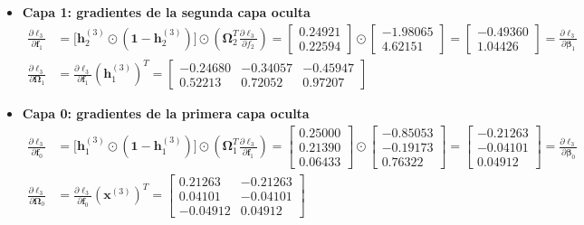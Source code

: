 \documentclass[10pt,a4paper]{article}
\begin{document}
{\begin{itemize}
    \item \textbf{Capa 1: gradientes de la segunda capa oculta}
    \begin{align*}
    \frac{\partial \ell_3}{\partial \mathbf{f}_1} &= \big[\mathbf{h}_2^{(3)} \odot (\mathbf{1} - \mathbf{h}_2^{(3)})\big] \odot \left(\boldsymbol{\Omega}_2^T \frac{\partial \ell_3}{\partial f_2}\right) = \begin{bmatrix} 0.24921 \\ 0.22594 \end{bmatrix} \odot \begin{bmatrix} -1.98065 \\ 4.62151 \end{bmatrix} = \mathbf{\begin{bmatrix} -0.49360 \\ 1.04426 \end{bmatrix}} = \frac{\partial \ell_3}{\partial \boldsymbol{\beta}_1} \\[0.1cm]
    \frac{\partial \ell_3}{\partial \boldsymbol{\Omega}_1} &= \frac{\partial \ell_3}{\partial \mathbf{f}_1} (\mathbf{h}_1^{(3)})^T = \mathbf{\begin{bmatrix} -0.24680 & -0.34057 & -0.45947 \\ 0.52213 & 0.72052 & 0.97207 \end{bmatrix}}
    \end{align*}

    \item \textbf{Capa 0: gradientes de la primera capa oculta}
    \begin{align*}
    \frac{\partial \ell_3}{\partial \mathbf{f}_0} &= \big[\mathbf{h}_1^{(3)} \odot (\mathbf{1} - \mathbf{h}_1^{(3)})\big] \odot \left(\boldsymbol{\Omega}_1^T \frac{\partial \ell_3}{\partial \mathbf{f}_1}\right) = \begin{bmatrix} 0.25000 \\ 0.21390 \\ 0.06433 \end{bmatrix} \odot \begin{bmatrix} -0.85053 \\ -0.19173 \\ 0.76322 \end{bmatrix} = \mathbf{\begin{bmatrix} -0.21263 \\ -0.04101 \\ 0.04912 \end{bmatrix}} = \frac{\partial \ell_3}{\partial \boldsymbol{\beta}_0} \\[0.1cm]
    \frac{\partial \ell_3}{\partial \boldsymbol{\Omega}_0} &= \frac{\partial \ell_3}{\partial \mathbf{f}_0} (\mathbf{x}^{(3)})^T = \mathbf{\begin{bmatrix} 0.21263 & -0.21263 \\ 0.04101 & -0.04101 \\ -0.04912 & 0.04912 \end{bmatrix}}
    \end{align*}
\end{itemize}
}
\end{document}
